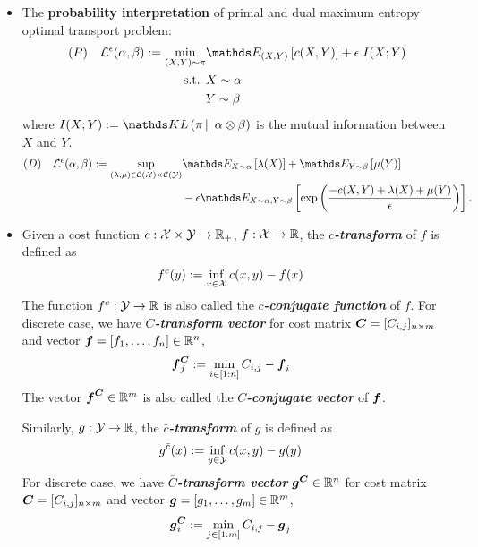 \documentclass[11pt]{article}
\begin{document}
\begin{itemize}
\item The \textbf{probability interpretation} of primal and dual maximum entropy optimal transport problem:
\begin{align}
(P)\quad \cL^{\epsilon}(\alpha, \beta) :=\min_{(X, Y) \sim \pi}& \E{(X,Y)}{c(X, Y)} + \epsilon\; I(X; Y) \label{eqn: optimal_transport_mutual_info} \\
\text{s.t. }& X\sim \alpha \nonumber\\
&Y \sim \beta \nonumber
\end{align} where $I(X; Y) :=  \kl{\pi}{\alpha\otimes \beta}$ is the mutual information between $X$ and $Y$.
\begin{align}
(D)\quad \cL^{\epsilon}(\alpha, \beta) := \sup_{(\lambda,\mu) \in \cC(\cX) \times \cC(\cY)} & \E{X \sim \alpha }{\lambda(X)}  + \E{Y \sim \beta}{\mu(Y)} \nonumber\\
& - \epsilon \E{X \sim \alpha, Y \sim \beta}{\exp\paren{\frac{-c(X,Y) + \lambda(X)+ \mu(Y)}{\epsilon}}}.  \label{eqn: optimal_transport_dual_entropy_prob}
\end{align}

\item Given a cost function $c: {\mathcal X} \times {\mathcal Y} \rightarrow {\mathbb R}_{+}$, $f: {\mathcal X} \rightarrow {\mathbb R}$, the \textbf{\emph{$c$-transform}} of $f$ is defined as
\begin{align}
f^{c}(y) &:= \inf_{x\in {\mathcal X}}c(x, y) - f(x)  \label{eqn: c_transform}
\end{align} The function $f^{c}: {\mathcal Y} \rightarrow {\mathbb R}$ is also called the \textbf{\emph{$c$-conjugate function}} of $f$. 
For discrete case, we have \textbf{\emph{$C$-transform vector}} for cost matrix $\boldsymbol{C} = [C_{i,j}]_{n \times m}$ and vector $\boldsymbol{f} = [f_1, \ldots, f_{n}] \in {\mathbb R}^{n}$, 
\begin{align}
 \boldsymbol{f}_{j}^{\boldsymbol{C}} &:= \min_{i \in [1:n]}C_{i,j} - \boldsymbol{f}_{i} \label{eqn: c_transform_vector}
\end{align} The vector $\boldsymbol{f}^{\boldsymbol{C}} \in {\mathbb R}^{m}$ is also called the \textbf{\emph{$C$-conjugate vector}} of $\boldsymbol{f}$.


Similarly, $g: {\mathcal Y} \rightarrow {\mathbb R}$, the \textbf{\emph{$\bar{c}$-transform}} of $g$ is defined as
\begin{align}
g^{\bar{c}}(x) &:= \inf_{y\in {\mathcal Y}}c(x, y) - g(y)  \label{eqn: c_bar_transform}
\end{align} 
For discrete case, we have \textbf{\emph{$\bar{C}$-transform vector}} $\boldsymbol{g}^{\bar{\boldsymbol{C}}} \in {\mathbb R}^{n}$ for cost matrix $\boldsymbol{C} = [C_{i,j}]_{n \times m}$ and vector $\boldsymbol{g} = [g_1, \ldots, g_{m}] \in {\mathbb R}^{m}$, 
\begin{align}
 \boldsymbol{g}_{i}^{\bar{\boldsymbol{C}}} &:= \min_{j \in [1:m]}C_{i,j} - \boldsymbol{g}_{j} \label{eqn: c_bar_transform_vector}
\end{align}



\end{itemize}
\end{document}
